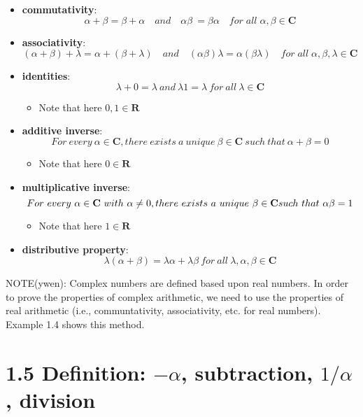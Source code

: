 \documentclass[12pt, letterpaper, oneside]{book}
\begin{document}
\begin{itemize}
  \item \textbf{commutativity}:
    \[
      \alpha + \beta = \beta + \alpha \quad and \quad \alpha\beta\ =
      \beta\alpha \quad for \; all \; \alpha, \beta \in \mathbf{C}
    \]
  \item \textbf{associativity}:
    \[
      (\alpha + \beta) + \lambda = \alpha + (\beta + \lambda) \quad and \quad
      (\alpha\beta)\lambda = \alpha(\beta\lambda) \quad for \; all \; \alpha,
      \beta, \lambda \in \mathbf{C}
    \]
  \item \textbf{identities}:
    \[
      \lambda + 0 = \lambda \ and \ \lambda1 = \lambda \ for \ all \ \lambda
      \in \mathbf{C}
    \]
    \begin{itemize}
      \item Note that here $0, 1 \in \mathbf{R}$
    \end{itemize}
  \item \textbf{additive inverse}:
    \[
      For \ every \ \alpha \in \mathbf{C}, there \ exists \ a \ unique \ \beta
      \in \mathbf{C} \ such \ that \ \alpha + \beta = 0
    \]
    \begin{itemize}
      \item Note that here $0 \in \mathbf{R}$
    \end{itemize}
  \item \textbf{multiplicative inverse}:
    \[
      For \ every \ \alpha \in \mathbf{C} \ with \ \alpha \neq 0, there \
      exists \ a \ unique \ \beta \in \mathbf{C} \newline such \ that \
      \alpha\beta = 1
    \]
    \begin{itemize}
      \item Note that here $1 \in \mathbf{R}$
    \end{itemize}
  \item \textbf{distributive property}:
    \[
      \lambda(\alpha + \beta) = \lambda\alpha + \lambda\beta \ for \ all \
      \lambda, \alpha, \beta \in \mathbf{C}
    \]
\end{itemize}

NOTE(ywen): Complex numbers are defined based upon real numbers. In order to
prove the properties of complex arithmetic, we need to use the properties of
real arithmetic (i.e., communtativity, associativity, etc. for real numbers).
Example 1.4 shows this method.

\section{1.5 Definition: $-\alpha$, subtraction, $1/\alpha$, division}
\end{document}
